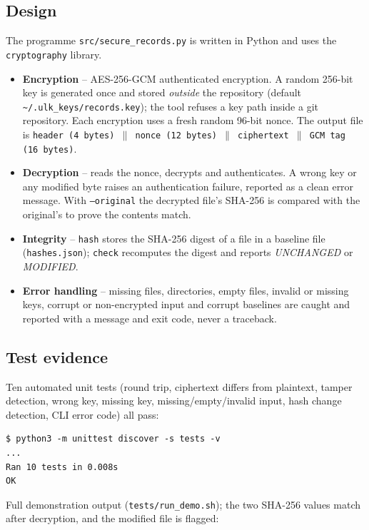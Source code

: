\documentclass[11pt,a4paper]{article}
\begin{document}
\subsection{Design}
The programme \texttt{src/secure\_records.py} is written in Python and uses the \texttt{cryptography} library.
\begin{itemize}[nosep]
  \item \textbf{Encryption} -- AES-256-GCM authenticated encryption. A random 256-bit key is generated once and stored
        \emph{outside} the repository (default \texttt{\textasciitilde/.ulk\_keys/records.key}); the tool refuses a key path inside a git
        repository. Each encryption uses a fresh random 96-bit nonce. The output file is
        \texttt{header (4 bytes) $\|$ nonce (12 bytes) $\|$ ciphertext $\|$ GCM tag (16 bytes)}.
  \item \textbf{Decryption} -- reads the nonce, decrypts and authenticates. A wrong key or any modified byte raises an
        authentication failure, reported as a clean error message. With \texttt{--original} the decrypted file's SHA-256
        is compared with the original's to prove the contents match.
  \item \textbf{Integrity} -- \texttt{hash} stores the SHA-256 digest of a file in a baseline file (\texttt{hashes.json});
        \texttt{check} recomputes the digest and reports \emph{UNCHANGED} or \emph{MODIFIED}.
  \item \textbf{Error handling} -- missing files, directories, empty files, invalid or missing keys, corrupt or non-encrypted
        input and corrupt baselines are caught and reported with a message and exit code, never a traceback.
\end{itemize}

\subsection{Test evidence}
Ten automated unit tests (round trip, ciphertext differs from plaintext, tamper detection, wrong key, missing key,
missing/empty/invalid input, hash change detection, CLI error code) all pass:
\begin{lstlisting}
$ python3 -m unittest discover -s tests -v
...
Ran 10 tests in 0.008s
OK
\end{lstlisting}
Full demonstration output (\texttt{tests/run\_demo.sh}); the two SHA-256 values match after decryption, and the
modified file is flagged:
{\footnotesize
}
\end{document}
